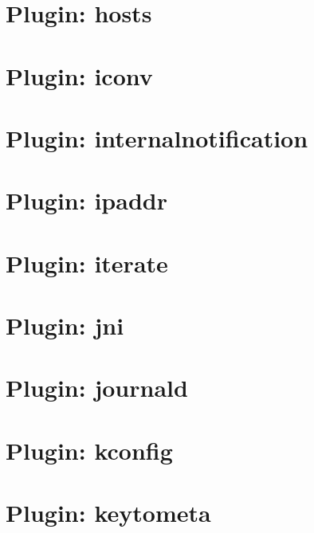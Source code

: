 \let\mypdfximage\pdfximage\def\pdfximage{\immediate\mypdfximage}\documentclass[twoside]{book}
\newcommand{\+}{\discretionary{\mbox{\scriptsize$\hookleftarrow$}}{}{}}
\begin{document}
\chapter{Plugin\+: hosts}
\label{md_src_plugins_hosts_README}

\chapter{Plugin\+: iconv}
\label{md_src_plugins_iconv_README}

\chapter{Plugin\+: internalnotification}
\label{md_src_plugins_internalnotification_README}

\chapter{Plugin\+: ipaddr}
\label{md_src_plugins_ipaddr_README}

\chapter{Plugin\+: iterate}
\label{md_src_plugins_iterate_README}

\chapter{Plugin\+: jni}
\label{md_src_plugins_jni_README}

\chapter{Plugin\+: journald}
\label{md_src_plugins_journald_README}

\chapter{Plugin\+: kconfig}
\label{md_src_plugins_kconfig_README}

\chapter{Plugin\+: keytometa}
\label{md_src_plugins_keytometa_README}

\end{document}
